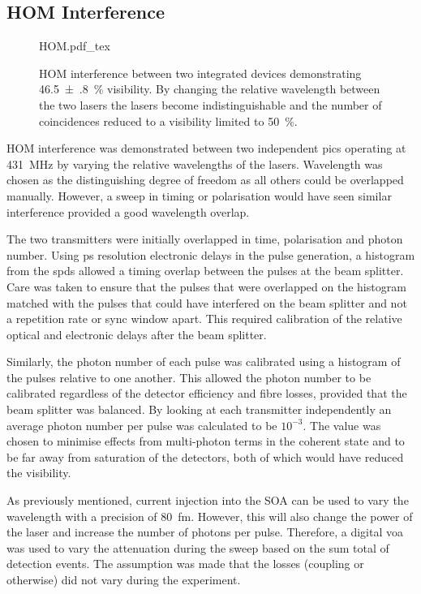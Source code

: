 \subsection{HOM Interference}

\begin{figure}[tp]
	\centering
	\def\svgwidth{0.8\textwidth} 
	{HOM.pdf_tex}
	\caption[Hong-Ou-Mandel interference between integrated devices]{\ac{HOM} interference between two integrated devices demonstrating \SI{46.5(8)}{\%} visibility. By changing the relative wavelength between the two lasers the lasers become indistinguishable and the number of coincidences reduced to a visibility limited to \SI{50}{\percent}.}
	\label{fig:HOM}
\end{figure}

\acl{HOM} interference was demonstrated between two independent \acp{pic} operating at \SI{431}{\MHz} by varying the relative wavelengths of the lasers. Wavelength was chosen as the distinguishing degree of freedom as all others could be overlapped manually. However, a sweep in timing or polarisation would have seen similar interference provided a good wavelength overlap. 

The two transmitters were initially overlapped in time, polarisation and photon number. Using ps resolution electronic delays in the pulse generation, a histogram from the \acp{spd} allowed a timing overlap between the pulses at the beam splitter. Care was taken to ensure that the pulses that were overlapped on the histogram matched with the pulses that could have interfered on the beam splitter and not a repetition rate or sync window apart. This required calibration of the relative optical and electronic delays after the beam splitter. 

Similarly, the photon number of each pulse was calibrated using a histogram of the pulses relative to one another. This allowed the photon number to be calibrated regardless of the detector efficiency and fibre losses, provided that the beam splitter was balanced. By looking at each transmitter independently an average photon number per pulse was calculated to be $10^{-3}$. The value was chosen to minimise effects from multi-photon terms in the coherent state and to be far away from saturation of the detectors, both of which would have reduced the visibility.

As previously mentioned, current injection into the \ac{SOA} can be used to vary the wavelength with a precision of \SI{80}{\femto\metre}. However, this will also change the power of the laser and increase the number of photons per pulse. Therefore, a digital \ac{voa} was used to vary the attenuation during the sweep based on the sum total of detection events. The assumption was made that the losses (coupling or otherwise) did not vary during the experiment. 

